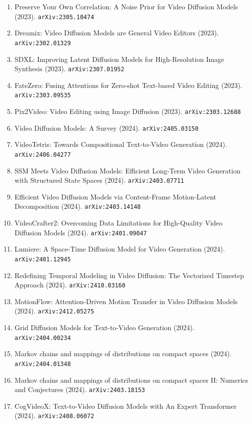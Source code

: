 \documentclass[11pt]{article}
\begin{document}
\begin{enumerate}
  Generation (2023). \texttt{arXiv:2303.08320}
  \item Preserve Your Own Correlation: A Noise Prior for Video Diffusion Models (2023). \texttt{arXiv:2305.10474}
  \item Dreamix: Video Diffusion Models are General Video Editors (2023). \texttt{arXiv:2302.01329}
  \item SDXL: Improving Latent Diffusion Models for High-Resolution Image
  Synthesis (2023). \texttt{arXiv:2307.01952}
  \item FateZero: Fusing Attentions for Zero-shot Text-based Video Editing (2023). \texttt{arXiv:2303.09535}
  \item Pix2Video: Video Editing using Image Diffusion (2023). \texttt{arXiv:2303.12688}
  \item Video Diffusion Models: A Survey (2024). \texttt{arXiv:2405.03150}
  \item VideoTetris: Towards Compositional Text-to-Video Generation (2024). \texttt{arXiv:2406.04277}
  \item SSM Meets Video Diffusion Models: Efficient Long-Term Video Generation
  with Structured State Spaces (2024). \texttt{arXiv:2403.07711}
  \item Efficient Video Diffusion Models via Content-Frame Motion-Latent
  Decomposition (2024). \texttt{arXiv:2403.14148}
  \item VideoCrafter2: Overcoming Data Limitations for High-Quality Video
  Diffusion Models (2024). \texttt{arXiv:2401.09047}
  \item Lumiere: A Space-Time Diffusion Model for Video Generation (2024). \texttt{arXiv:2401.12945}
  \item Redefining Temporal Modeling in Video Diffusion: The Vectorized Timestep
  Approach (2024). \texttt{arXiv:2410.03160}
  \item MotionFlow: Attention-Driven Motion Transfer in Video Diffusion Models (2024). \texttt{arXiv:2412.05275}
  \item Grid Diffusion Models for Text-to-Video Generation (2024). \texttt{arXiv:2404.00234}
  \item Markov chains and mappings of distributions on compact spaces (2024). \texttt{arXiv:2404.01348}
  \item Markov chains and mappings of distributions on compact spaces II:
  Numerics and Conjectures (2024). \texttt{arXiv:2403.18153}
  \item CogVideoX: Text-to-Video Diffusion Models with An Expert Transformer (2024). \texttt{arXiv:2408.06072}

\end{enumerate}
\end{document}
